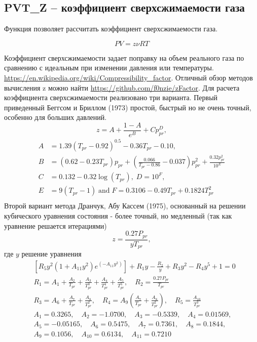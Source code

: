 \subsection{PVT\_Z – коэффициент сверхсжимаемости газа}

Функция позволяет рассчитать коэффициент сверхсжимаемости газа. 


$$ PV = z \nu RT  $$

Коэффициент сверхсжимаемости задает поправку на объем реального газа по сравнению с идеальным при изменении давления или температуры. \url{https://en.wikipedia.org/wiki/Compressibility_factor}. Отличный обзор методов вычисления z можно найти \url{https://github.com/f0nzie/zFactor}.
Для расчета коэффициента сверхсжимаемости реализовано три варианта. Первый приведенный Беггсом и Бриллом (1973) простой, быстрый но не очень точный, особенно для больших давлений.
$$
z = A + \frac{1 - A}{{e^{B} }} + Cp_{pr}^{D} ,
$$
$$
\begin{aligned} A & = 1.39(T_{pr} - 0.92)^{0.5} - 0.36T_{pr} - 0.10, \\ B & = (0.62 - 0.23T_{pr} )p_{pr} + \left( {\frac{0.066}{{T_{pr} - 0.86}} - 0.037} \right)p_{pr}^{2} + \frac{{0.32p_{pr}^{2} }}{{10^{E} }} \\ C & = 0.132 - 0.32\log (T_{pr} ), \;D = 10^{F} , \\ E & = 9(T_{pr} - 1)\;{\text{and}}\; F = 0.3106 - 0.49T_{pr} + 0.1824T_{pr}^{2} \\ \end{aligned}
$$
Второй вариант метода Дранчук, Абу Кассем (1975), основанный на решении кубического уравнения состояния - более точный, но медленный (так как уравнение решается итерациями) 
$$
z = \frac{{0.27P_{pr} }}{{yT_{pr} }},
$$
где $y$ решение уравнения 
$$
\begin{aligned} & \left[ {R_{5} y^{2} (1 + A_{11} y^{2} )e^{{( - A_{11} y^{2} )}} } \right] + R_{1} y - \frac{{R_{2} }}{y} + R_{3} y^{2} - R_{4} y^{5} + 1 = 0 \\ & R_{1} = A_{1} + \frac{{A_{2} }}{{T_{pr} }} + \frac{{A_{3} }}{{T_{pr}^{3} }} + \frac{{A_{4} }}{{T_{pr}^{4} }} + \frac{{A_{5} }}{{T_{pr}^{5} }}, \quad R_{2} = \frac{{0.27P_{pr} }}{{T_{pr} }} \\ & R_{3} = A_{6} + \frac{{A_{7} }}{{T_{pr} }} + \frac{{A_{8} }}{{T_{pr}^{2} }},\quad R_{4} = A_{9} \left( {\frac{{A_{7} }}{{T_{pr} }} + \frac{{A_{8} }}{{T_{pr}^{2} }}} \right), \quad R_{5} = \frac{{A_{10} }}{{T_{pr}^{3} }} \\ & A_{1} = 0.3265, \quad A_{2} = - 1.0700, \quad A_{3} = - 0.5339, \quad A_{4} = 0.01569, \\ & A_{5} = - 0.05165, \quad A_{6} = 0.5475, \quad A_{7} = 0.7361, \quad A_{8} = 0.1844, \\ & A_{9} = 0.1056, \quad A_{10} = 0.6134, \quad A_{11} = 0.7210 \\ \end{aligned}
$$
